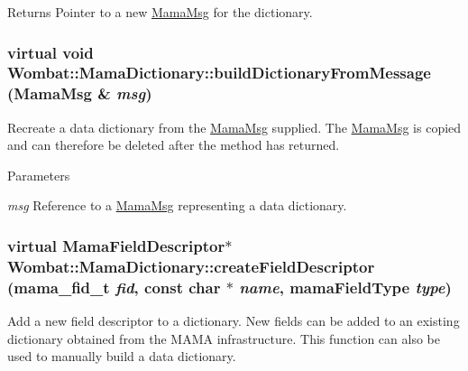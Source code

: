 \begin{DoxyReturn}{Returns}
Pointer to a new \hyperlink{classWombat_1_1MamaMsg}{MamaMsg} for the dictionary. 
\end{DoxyReturn}
\hypertarget{classWombat_1_1MamaDictionary_a3fa0ae5302f3765479ccc5c923c30c4a}{
\subsubsection[{buildDictionaryFromMessage}]{\setlength{\rightskip}{0pt plus 5cm}virtual void Wombat::MamaDictionary::buildDictionaryFromMessage ({\bf MamaMsg} \& {\em msg})}}
\label{classWombat_1_1MamaDictionary_a3fa0ae5302f3765479ccc5c923c30c4a}


Recreate a data dictionary from the \hyperlink{classWombat_1_1MamaMsg}{MamaMsg} supplied. The \hyperlink{classWombat_1_1MamaMsg}{MamaMsg} is copied and can therefore be deleted after the method has returned.


\begin{DoxyParams}{Parameters}
\item[{\em msg}]Reference to a \hyperlink{classWombat_1_1MamaMsg}{MamaMsg} representing a data dictionary. \end{DoxyParams}
\hypertarget{classWombat_1_1MamaDictionary_a5d4f9d94baee4ae4e7ee8f184f982296}{
\subsubsection[{createFieldDescriptor}]{\setlength{\rightskip}{0pt plus 5cm}virtual {\bf MamaFieldDescriptor}$\ast$ Wombat::MamaDictionary::createFieldDescriptor (mama\_\-fid\_\-t {\em fid}, \/  const char $\ast$ {\em name}, \/  mamaFieldType {\em type})}}
\label{classWombat_1_1MamaDictionary_a5d4f9d94baee4ae4e7ee8f184f982296}


Add a new field descriptor to a dictionary. New fields can be added to an existing dictionary obtained from the MAMA infrastructure. This function can also be used to manually build a data dictionary.


